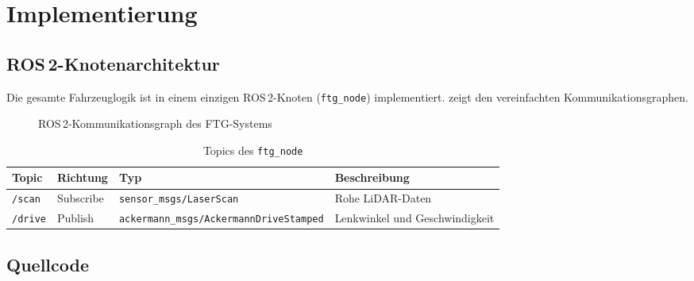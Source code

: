 \chapter{Implementierung}
\label{chap:implementierung}

\section{ROS\,2-Knotenarchitektur}
\label{sec:ros_nodes}

Die gesamte Fahrzeuglogik ist in einem einzigen ROS\,2-Knoten
(\texttt{ftg\_node}) implementiert.
 zeigt den vereinfachten Kommunikationsgraphen.

\begin{figure}[H]
  \centering
  \caption{ROS\,2-Kommunikationsgraph des FTG-Systems}
  \label{fig:ros_graph}
\end{figure}

\begin{table}[H]
  \centering
  \caption{Topics des \texttt{ftg\_node}}
  \label{tab:topics}
  \begin{tabular}{@{}llll@{}}
    \toprule
    \textbf{Topic}  & \textbf{Richtung} & \textbf{Typ}
                    & \textbf{Beschreibung} \\
    \midrule
    \texttt{/scan}  & Subscribe  & \texttt{sensor\_msgs/LaserScan}
                    & Rohe LiDAR-Daten \\
    \texttt{/drive} & Publish    & \texttt{ackermann\_msgs/AckermannDriveStamped}
                    & Lenkwinkel und Geschwindigkeit \\
    \bottomrule
  \end{tabular}
\end{table}

\section{Quellcode}
\label{sec:source_code}

